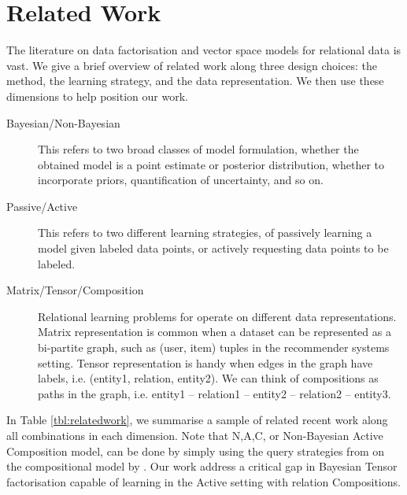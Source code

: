 
\section{Related Work}

The literature on data factorisation and vector space models for 
relational data is vast. 
We give a brief overview of related work along three design choices:
the method, the learning strategy, and the data representation. 
We then use these dimensions to help position our work. 
\begin{description}
\item[Bayesian/Non-Bayesian] This refers to two broad classes of model 
formulation, whether the obtained model is a point estimate or posterior 
distribution, whether to incorporate priors, quantification of uncertainty, 
and so on. 
\item[Passive/Active] This refers to two different learning strategies, 
of passively learning a model given labeled data points, or actively 
requesting data points to be labeled.
\item[Matrix/Tensor/Composition] Relational learning problems for operate on 
different data representations. Matrix representation is common when a dataset 
can be represented as a bi-partite graph, such as (user, item) tuples in the 
recommender systems setting. Tensor representation is handy when edges in the 
graph have labels, i.e. (entity1, relation, entity2). We can think of 
compositions as paths in the graph, i.e. entity1 -- relation1 -- entity2 -- 
relation2 -- entity3.
\end{description}
In Table \ref{tbl:relatedwork}, we summarise a sample of related recent work 
along all combinations in each dimension. 
Note that N,A,C, or Non-Bayesian Active Composition model, can be done by 
simply using the query strategies from \cite{kajino2015active} on the 
compositional model by \cite{guu2015traversing}. Our work address a critical gap 
in Bayesian Tensor factorisation capable of learning in the 
Active setting with relation Compositions.

